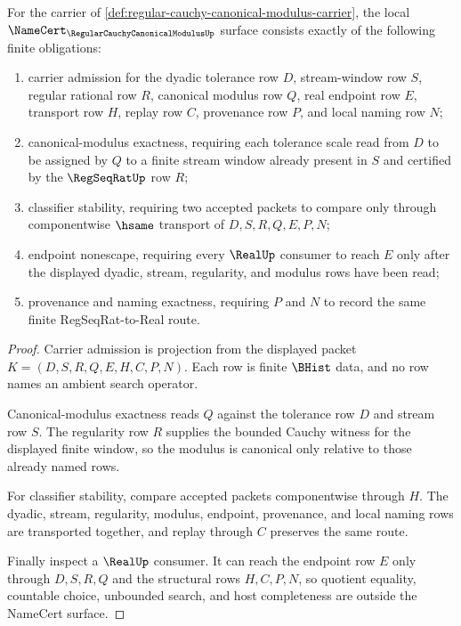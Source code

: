 \begin{theorem}
\label{thm:regular-cauchy-canonical-modulus-namecert-obligations}
For the carrier of \autoref{def:regular-cauchy-canonical-modulus-carrier}, the local $\NameCert_{\RegularCauchyCanonicalModulusUp}$ surface consists exactly of the following finite obligations:
\begin{enumerate}
\item carrier admission for the dyadic tolerance row $D$, stream-window row $S$, regular rational row $R$, canonical modulus row $Q$, real endpoint row $E$, transport row $H$, replay row $C$, provenance row $P$, and local naming row $N$;
\item canonical-modulus exactness, requiring each tolerance scale read from $D$ to be assigned by $Q$ to a finite stream window already present in $S$ and certified by the $\RegSeqRatUp$ row $R$;
\item classifier stability, requiring two accepted packets to compare only through componentwise $\hsame$ transport of $D,S,R,Q,E,P,N$;
\item endpoint nonescape, requiring every $\RealUp$ consumer to reach $E$ only after the displayed dyadic, stream, regularity, and modulus rows have been read;
\item provenance and naming exactness, requiring $P$ and $N$ to record the same finite RegSeqRat-to-Real route.
\end{enumerate}
\end{theorem}
\begin{proof}
Carrier admission is projection from the displayed packet $K=(D,S,R,Q,E,H,C,P,N)$. Each row is finite $\BHist$ data, and no row names an ambient search operator.

Canonical-modulus exactness reads $Q$ against the tolerance row $D$ and stream row $S$. The regularity row $R$ supplies the bounded Cauchy witness for the displayed finite window, so the modulus is canonical only relative to those already named rows.

For classifier stability, compare accepted packets componentwise through $H$. The dyadic, stream, regularity, modulus, endpoint, provenance, and local naming rows are transported together, and replay through $C$ preserves the same route.

Finally inspect a $\RealUp$ consumer. It can reach the endpoint row $E$ only through $D,S,R,Q$ and the structural rows $H,C,P,N$, so quotient equality, countable choice, unbounded search, and host completeness are outside the NameCert surface.
\end{proof}

